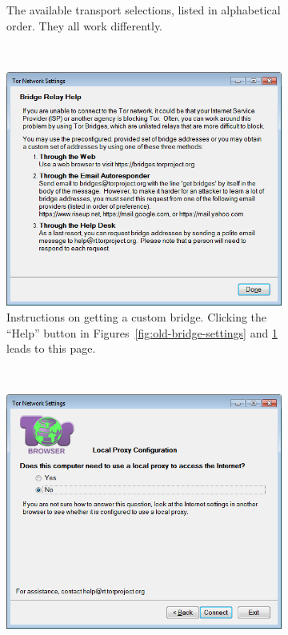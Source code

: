 \documentclass[USenglish,oneside,twocolumn]{article}
\begin{document}
\begin{figure}
\begin{subfigure}[b]{0.30\textwidth}
	\centering\captionsetup{width=1.5\linewidth}%
	\caption{The available transport selections, listed in alphabetical order. They all work differently.}
	\label{fig:old-bridge-combobox}
\end{subfigure}
~~~~~~~~~~
\begin{subfigure}[b]{0.30\textwidth}
	\includegraphics[width=\textwidth]{screenshots/OLD-bridgeHelp.png}
	\centering\captionsetup{width=1.5\linewidth}%
	\caption{Instructions on getting a custom bridge. Clicking the ``Help'' button in Figures~\ref{fig:old-bridge-settings} and \ref {fig:old-bridge-combobox} leads to this page.}
	\label{fig:old-bridge-help}
\end{subfigure}
~~~~~~~~~~~~~~~~~~~~~~~~~
\begin{subfigure}[b]{0.30\textwidth}
	\includegraphics[width=\textwidth]{screenshots/OLD-proxy.png}

\end{subfigure}
\end{figure}
\end{document}
